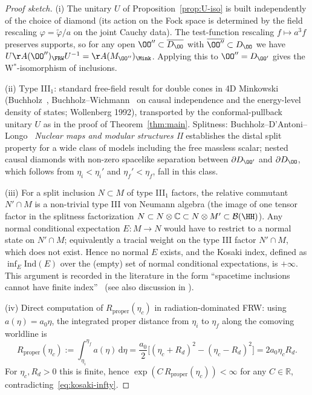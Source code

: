 \begin{proof}[Proof sketch]
(i) The unitary $U$ of Proposition~\ref{prop:U-iso} is built independently of
the choice of diamond (its action on the Fock space is determined by the
field rescaling $\varphi = \tilde\varphi/a$ on the joint Cauchy data). The
test-function rescaling $f\mapsto a^3 f$ preserves supports, so for any open
$\OO''\subset \overline{D_\OO}$ with $\overline{\OO''}\subset D_\OO$ we have
$U\AA(\OO'')_\FRW U^{-1} = \AA(M_{\OO''})_\Mink$. Applying this to
$\OO''=D_{\OO'}$ gives the W$^*$-isomorphism of inclusions.

(ii) Type III$_1$: standard free-field result for double cones in 4D
Minkowski (Buchholz~\cite{Buchholz1974}, Buchholz--Wichmann~\cite{BuchholzWichmann1986}
on causal independence and the energy-level density of states; Wollenberg
1992), transported by the conformal-pullback unitary $U$ as in the proof of
Theorem~\ref{thm:main}. Splitness: Buchholz--D'Antoni--Longo~\cite{BuchholzDAntoniLongo1990}
\emph{Nuclear maps and modular structures II} establishes the distal split
property for a wide class of models including the free massless scalar;
nested causal diamonds with non-zero spacelike separation between
$\partial D_{\OO'}$ and $\partial D_\OO$, which follows from
$\eta_i<\eta_i'$ and $\eta_f'<\eta_f$, fall in this class.

(iii) For a split inclusion $N\subset M$ of type III$_1$ factors, the relative
commutant $N'\cap M$ is a non-trivial type III von Neumann algebra (the image
of one tensor factor in the splitness factorization
$N\subset N\otimes \mathbb{C}\subset N\otimes M' \subset \mathcal{B}(\HH)$).
Any normal conditional expectation $E:M\to N$ would have to restrict to a
normal state on $N'\cap M$; equivalently a tracial weight on the type III
factor $N'\cap M$, which does not exist. Hence no normal $E$ exists, and the
Kosaki index, defined as $\inf_E \mathrm{Ind}(E)$ over the (empty) set of
normal conditional expectations, is $+\infty$. This argument is recorded in
the literature in the form ``spacetime inclusions cannot have finite
index''~\cite[\S2]{LeutheusserLiu2025} (see also discussion in
\cite[\S3]{XYZ2026qftprotocol}).

(iv) Direct computation of $R_{\text{proper}}(\eta_c)$ in radiation-dominated
FRW: using $a(\eta)=a_0\eta$, the integrated proper distance from $\eta_i$ to
$\eta_f$ along the comoving worldline is
\begin{equation}
R_{\text{proper}}(\eta_c) := \int_{\eta_i}^{\eta_f} a(\eta)\,\mathrm{d}\eta
 = \frac{a_0}{2}\bigl[(\eta_c+R_d)^2-(\eta_c-R_d)^2\bigr] = 2 a_0 \eta_c R_d.
\end{equation}
For $\eta_c, R_d>0$ this is finite, hence $\exp(C\,R_{\text{proper}}(\eta_c))<\infty$
for any $C\in\mathbb{R}$, contradicting~\eqref{eq:kosaki-infty}.
\end{proof}

